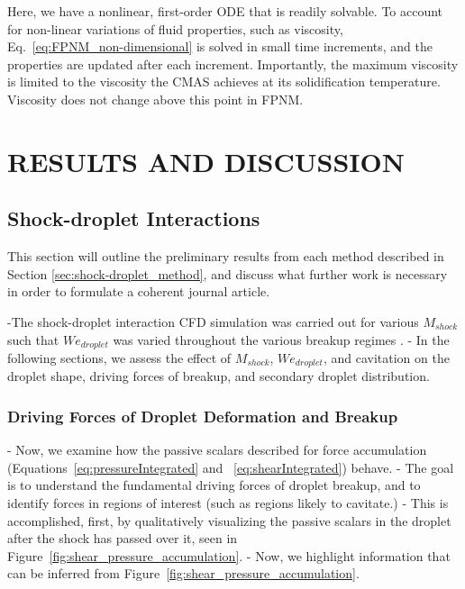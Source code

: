 \documentclass{UCF_ETD}
\begin{document}


\noindent Here, we have a nonlinear, first-order ODE that is readily solvable. To account for non-linear variations of fluid properties, such as viscosity, Eq.~\ref{eq:FPNM_non-dimensional} is solved in small time increments, and the properties are updated after each increment. Importantly, the maximum viscosity is limited to the viscosity the CMAS achieves at its solidification temperature. Viscosity does not change above this point in FPNM.

\chapter{RESULTS AND DISCUSSION}
\section{Shock-droplet Interactions}
\label{sec:shockDropResults}

This section will outline the preliminary results from each method described in Section \ref{sec:shock-droplet_method}, and discuss what further work is necessary in order to formulate a coherent journal article.

-The shock-droplet interaction CFD simulation was carried out for various $M_{shock}$ such that $We_{droplet}$ was varied throughout the various breakup regimes \cite{PILCH1987741}. 
- In the following sections, we assess the effect of $M_{shock}$, $We_{droplet}$, and cavitation on the droplet shape, driving forces of breakup, and secondary droplet distribution.



\subsection{Driving Forces of Droplet Deformation and Breakup}

- Now, we examine how the passive scalars described for force accumulation (Equations~\ref{eq:pressureIntegrated} and ~\ref{eq:shearIntegrated}) behave.
- The goal is to understand the fundamental driving forces of droplet breakup, and to identify forces in regions of interest (such as regions likely to cavitate.)
- This is accomplished, first, by qualitatively visualizing the passive scalars in the droplet after the shock has passed over it, seen in Figure~\ref{fig:shear_pressure_accumulation}.
- Now, we highlight information that can be inferred from Figure~\ref{fig:shear_pressure_accumulation}.\\
\end{document}
